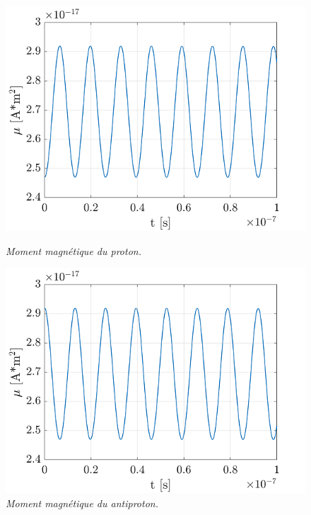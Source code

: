 \documentclass[a4paper,12pt,twoside]{article}
\begin{document}
\begin{figure}
\begin{minipage}[c]{.46\linewidth}
					\centering
					\includegraphics[scale = 0.6]{mm_p.png}
					\caption{\em\label{Fig: mm Prot} Moment magn\'etique du proton.}
				\end{minipage}
				\hfill%
				\begin{minipage}[c]{.46\linewidth}
					\centering
					\includegraphics[scale = 0.6]{mm_ap.png}
					\caption{\em\label{Fig: mm Anti} Moment magn\'etique du antiproton.}
				\end{minipage}
			\end{figure}
\end{document}
